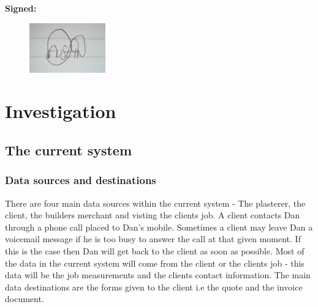 \begin{flushleft}
	\textbf{Signed:}
\begin{figure}[H]
    \includegraphics{./Analysis/images/signature.jpg}
\end{figure}

\end{flushleft}



\section{Investigation}

\subsection{The current system}





\subsubsection{Data sources and destinations}


\begin{flushleft}
	There are four main data sources within the current system - The plasterer, the client, the builders merchant and visting the clients job. A client contacts Dan through a phone call placed to Dan's mobile. Sometimes a client may leave Dan a voicemail message if he is too busy to answer the call at that given moment. If this is the case then Dan will get back to the client as soon as possible. Most of the data in the current system will come from the client or the clients job - this data will be the job measurements and the clients contact information. The main data destinations are the forms given to the client i.e the quote and the invoice document.

\end{flushleft}


